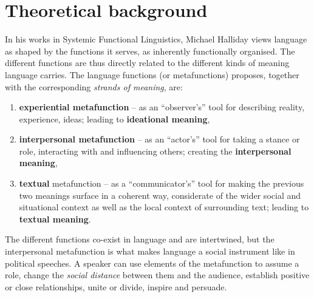 \documentclass[11pt]{article}
\begin{document}
\section{Theoretical background}{
	In his works in Systemic Functional Linguistics, Michael Halliday views language as shaped by the functions it serves, as inherently functionally organised. The different functions are thus directly related to the different kinds of meaning language carries.
	The language functions (or metafunctions) \citet{Halliday1970IM} proposes, together with the corresponding \textit{strands of meaning}, are:
	\begin{enumerate}
		\item \textbf{experiential metafunction} -- as an ``observer's'' tool for describing reality, experience, ideas; leading to \textbf{ideational meaning},
		\item \textbf{interpersonal metafunction} -- as an ``actor's'' tool for taking a stance or role, interacting with and influencing others; creating the \textbf{interpersonal meaning},
		\item \textbf{textual} metafunction -- as a ``communicator's'' tool for making the previous two meanings surface in a coherent way, considerate of the wider social and situational context as well as the local context of surrounding text; leading to \textbf{textual meaning}.
	\end{enumerate}
	The different functions co-exist in language and are intertwined, but the interpersonal metafunction is what makes language a social instrument like in political speeches. A speaker can use elements of the metafunction to assume a role, change the \textit{social distance} between them and the audience, establish positive or close relationships, unite or divide, inspire and persuade.
}
\end{document}
